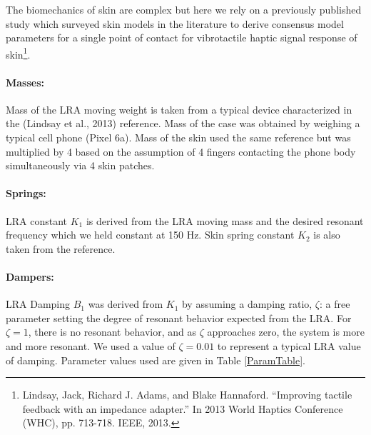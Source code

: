\documentclass[letterpaper,11pt]{article}
\begin{document}
The biomechanics of skin are complex but here we rely on a previously published study which surveyed skin models in the literature to
derive consensus model parameters for a single point of contact for vibrotactile haptic signal response of skin\footnote{Lindsay, Jack, Richard J. Adams, and Blake Hannaford. ``Improving tactile feedback with an impedance adapter.'' In 2013 World Haptics Conference (WHC), pp. 713-718. IEEE, 2013.
}.
\paragraph{Masses:}
Mass of the LRA moving weight is taken from a typical device characterized in the (Lindsay et al., 2013) reference.   Mass of the case was
obtained by weighing a typical cell phone (Pixel 6a).   Mass of the skin used the same reference but was multiplied by 4 based on the assumption of
4 fingers contacting the phone body simultaneously via 4 skin patches.

\paragraph{Springs:}
LRA constant $K_1$ is derived from the LRA moving mass and the desired resonant frequency
which we held constant at 150 Hz.  Skin spring constant
$K_2$ is also  taken from the reference.

\paragraph{Dampers:}
LRA Damping $B_1$ was derived from $K_1$ by assuming a damping ratio, $\zeta$:
a free parameter setting the degree of resonant behavior expected from the LRA.
For $\zeta=1$, there is no resonant behavior, and as $\zeta$ approaches zero, the system is more and more resonant.  We used a value of $\zeta=0.01$
to represent a typical LRA value of damping.  Parameter values used are given
in Table \ref{ParamTable}.
\end{document}
